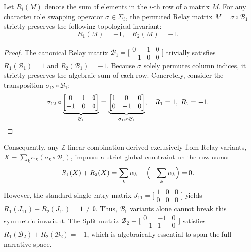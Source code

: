 \documentclass[sigconf,review,anonymous]{acmart}
\newcommand{\calB}{\mathcal{B}}
\begin{document}
\begin{lemma}[Row-Sum Invariance of $\calB_1$]
Let $R_i(M)$ denote the sum of elements in the $i$-th row of a matrix $M$. For any character role swapping operator $\sigma \in \Sigma_3$, the permuted Relay matrix $M = \sigma \circ \calB_1$ strictly preserves the following topological invariant:
\begin{equation}
R_1(M) = +1, \quad R_2(M) = -1.
\end{equation}
\end{lemma}

\begin{proof}
The canonical Relay matrix $\calB_1 = \bigl[\begin{smallmatrix} 0 & 1 & 0 \\ -1 & 0 & 0 \end{smallmatrix}\bigr]$ trivially satisfies $R_1(\calB_1) = 1$ and $R_2(\calB_1) = -1$. Because $\sigma$ solely permutes column indices, it strictly preserves the algebraic sum of each row. Concretely, consider the transposition $\sigma_{12} \circ \calB_1$:
\begin{equation}
\sigma_{12} \circ \underbrace{\begin{bmatrix} 0 & 1 & 0 \\ -1 & 0 & 0 \end{bmatrix}}_{\calB_1} = \underbrace{\begin{bmatrix} 1 & 0 & 0 \\ 0 & -1 & 0 \end{bmatrix}}_{\sigma_{12} \circ \calB_1}, \quad R_1 = 1, \; R_2 = -1. \qedhere
\end{equation}
\end{proof}

Consequently, any $\mathbb{Z}$-linear combination derived exclusively from Relay variants, $X = \sum_k \alpha_k (\sigma_k \circ \calB_1)$, imposes a strict global constraint on the row sums:
\begin{equation}
R_1(X) + R_2(X) = \sum_k \alpha_k + \Bigl(-\sum_k \alpha_k\Bigr) = 0.
\end{equation}
However, the standard single-entry matrix $J_{11} = \bigl[\begin{smallmatrix} 1 & 0 & 0 \\ 0 & 0 & 0 \end{smallmatrix}\bigr]$ yields $R_1(J_{11}) + R_2(J_{11}) = 1 \neq 0$. Thus, $\calB_1$ variants alone cannot break this symmetric invariant. The Split matrix $\calB_2 = \bigl[\begin{smallmatrix} 0 & -1 & 0 \\ -1 & 1 & 0 \end{smallmatrix}\bigr]$ satisfies $R_1(\calB_2) + R_2(\calB_2) = -1$, which is algebraically essential to span the full narrative space.
\end{document}
